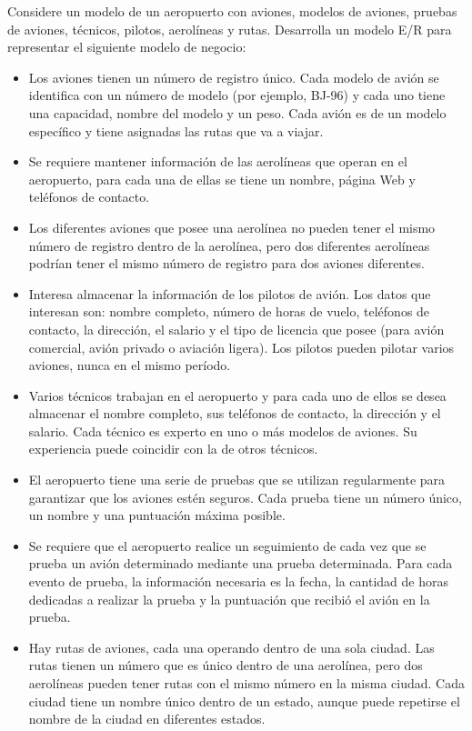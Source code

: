 \documentclass{exam}
\begin{document}
\begin{questions}
	Considere un modelo de un aeropuerto con aviones, modelos de aviones, pruebas de aviones, técnicos, pilotos, aerolíneas y rutas. Desarrolla un modelo E/R para representar el siguiente modelo de negocio:
	
	\begin{itemize}
		\item Los aviones tienen un número de registro único. Cada modelo de avión se identifica con un número de modelo (por ejemplo, BJ-96) y cada uno tiene una capacidad, nombre del modelo y un peso. Cada avión es de un modelo específico y tiene asignadas las rutas que va a viajar.
		\item Se requiere mantener información de las aerolíneas que operan en el aeropuerto, para cada una de ellas se tiene un nombre, página Web y teléfonos de contacto.
		\item Los diferentes aviones que posee una aerolínea no pueden tener el mismo número de registro dentro de la aerolínea, pero dos diferentes aerolíneas podrían tener el mismo número de registro para dos aviones diferentes.
		\item Interesa almacenar la información de los pilotos de avión. Los datos que interesan son: nombre completo, número de horas de vuelo, teléfonos de contacto, la dirección, el salario y el tipo de licencia que posee (para avión comercial, avión privado o aviación ligera). Los pilotos pueden pilotar varios aviones, nunca en el mismo período.
		\item Varios técnicos trabajan en el aeropuerto y para cada uno de ellos se desea almacenar el nombre completo, sus teléfonos de contacto, la dirección y el salario. Cada técnico es experto en uno o más modelos de aviones. Su experiencia puede coincidir con la de otros técnicos.
		\item El aeropuerto tiene una serie de pruebas que se utilizan regularmente para garantizar que los aviones estén seguros. Cada prueba tiene un número único, un nombre y una puntuación máxima posible.
		\item Se requiere que el aeropuerto realice un seguimiento de cada vez que se prueba un avión determinado mediante una prueba determinada. Para cada evento de prueba, la información necesaria es la fecha, la cantidad de horas dedicadas a realizar la prueba y la puntuación que recibió el avión en la prueba.
		\item Hay rutas de aviones, cada una operando dentro de una sola ciudad. Las rutas tienen un número que es único dentro de una aerolínea, pero dos aerolíneas pueden tener rutas con el mismo número en la misma ciudad. Cada ciudad tiene un nombre único dentro de un estado, aunque puede repetirse el nombre de la ciudad en diferentes estados.
	\end{itemize}		
	

\end{questions}
\end{document}
